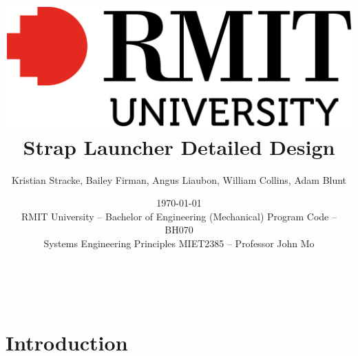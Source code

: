\documentclass[a4paper,10pt]{article} %
\begin{document}
    \fancyhf{}
    \renewcommand{\headrulewidth}{0pt}
    \pagestyle{fancy}

\newenvironment{FRpage}{%
  \clearpage
  \begin{landscape}
  \thispagestyle{plain}
  \begingroup
  \footnotesize
  \setlength{\tabcolsep}{3.5pt} %
}{%
  \endgroup
  \end{landscape}
  \clearpage
}


\author{Kristian Stracke, Bailey Firman, Angus Liaubon, William Collins, Adam Blunt}\\
\date{\today\\[2ex]
RMIT University – Bachelor of Engineering (Mechanical) Program Code – BH070 \\
\bigskip
Systems Engineering Principles MIET2385 – Professor John Mo}


\title{\includegraphics*[scale=0.1]{rmit-university-logo.png} \\[14ex] \textbf{Strap Launcher Detailed Design}} %

\maketitle
\thispagestyle{empty}

\setcounter{page}{0}

\newpage

\tableofcontents
\listoftables
\listoffigures

\newpage

\justifying

\setcounter{page}{1}



\section{Introduction}
\end{document}
